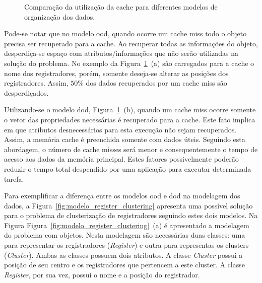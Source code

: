\begin{figure}[bh]
    \caption[Comparação da utilização da cache]{Comparação da utilização da cache para diferentes modelos de organização dos dados.}
    \label{fig:cache_register_clustering}
\end{figure}

Pode-se notar que no modelo \ac{ood}, quando ocorre um cache miss todo o objeto precisa ser recuperado para a cache. Ao recuperar todas as informações do objeto, desperdiça-se espaço com atributos/informações que não serão utilizadas na solução do problema. No exemplo da Figura~\ref{fig:cache_register_clustering}~(a) são carregados para a cache o nome dos registradores, porém, somente deseja-se alterar as posições dos registradores. Assim, $50\%$ dos dados recuperados por um cache miss são desperdiçados.



Utilizando-se o modelo \ac{dod}, Figura~\ref{fig:cache_register_clustering}~(b), quando um cache miss ocorre somente o vetor das propriedades necessárias é recuperado para a cache. Este fato implica em que atributos desnecessários para esta execução não sejam recuperados. Assim, a memória cache é preenchida somente com dados úteis.
Seguindo esta abordagem, o número de cache misses será menor e consequentemente o tempo de acesso aos dados da memória principal. Estes fatores possivelmente poderão reduzir o tempo total despendido por uma aplicação para executar determinada tarefa.



Para exemplificar a diferença entre os modelos \ac{ood} e \ac{dod} na modelagem dos dados, a Figura~\ref{fig:modelo_register_clustering} apresenta uma possível solução para o problema de clusterização de registradores seguindo estes dois modelos.
Na Figura Figura~\ref{fig:modelo_register_clustering}~(a) é apresentado a modelagem do problema com objetos. Nesta modelagem são necessárias duas classes: uma para representar os registradores (\textit{Register}) e outra para representas os clusters (\textit{Cluster}). Ambas as classes possuem dois atributos. A classe \textit{Cluster} possui a posição de seu centro e os registradores que pertencem a este cluster. A classe \textit{Register}, por sua vez, possui o nome e a posição do registrador.

